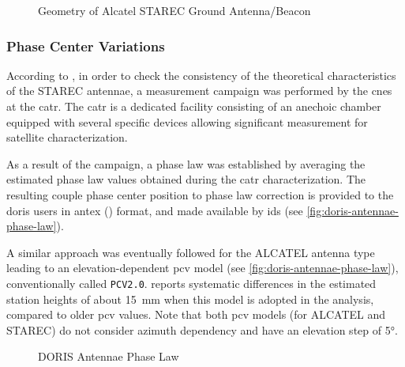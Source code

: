\begin{figure}
  \centering
  
  \caption{Geometry of Alcatel STAREC Ground Antenna/Beacon}
  \label{fig:starec-antenna}
\end{figure}

\subsubsection{Phase Center Variations}\label{sssec:doris-pcv}
According to \cite{Tourain2016}, in order to check the consistency of the theoretical 
characteristics of the STAREC antennae, a measurement campaign was performed by 
the \gls{cnes} at the \gls{catr}. The \gls{catr} is a dedicated facility 
consisting of an anechoic chamber equipped with several specific devices 
allowing significant measurement for satellite characterization.

As a result of the campaign, a phase law was established by averaging the 
estimated phase law values obtained during the \gls{catr} characterization. 
The resulting couple phase center position to phase law correction is provided 
to the \gls{doris} users in \gls{antex} (\cite{ANTEXv14}) format, and 
made available by \gls{ids} (see \autoref{fig:doris-antennae-phase-law}).

A similar approach was eventually followed for the ALCATEL antenna type 
leading to an elevation-dependent \gls{pcv} model (see \autoref{fig:doris-antennae-phase-law}), 
conventionally called \texttt{PCV2.0}. \cite{Stepanek2022b} reports systematic differences in 
the estimated station heights of about \SI{15}{\milli\meter} when this model is 
adopted in the analysis, compared to older \gls{pcv} values. Note that both 
\gls{pcv} models (for ALCATEL and STAREC) do not consider azimuth dependency 
and have an elevation step of \ang{5}.

\begin{figure}
  \centering
  
  \caption{DORIS Antennae Phase Law}
  \label{fig:doris-antennae-phase-law}
\end{figure}
